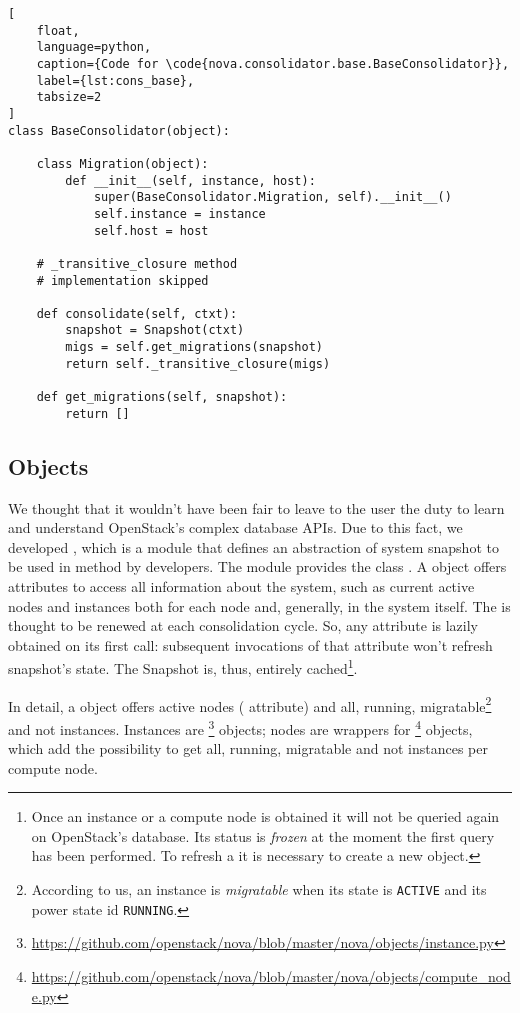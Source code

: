 \begin{lstlisting}[
	float,
	language=python,
	caption={Code for \code{nova.consolidator.base.BaseConsolidator}},
	label={lst:cons_base},
	tabsize=2
]
class BaseConsolidator(object):

	class Migration(object):
		def __init__(self, instance, host):
			super(BaseConsolidator.Migration, self).__init__()
			self.instance = instance
			self.host = host

	# _transitive_closure method
	# implementation skipped

	def consolidate(self, ctxt):
		snapshot = Snapshot(ctxt)
		migs = self.get_migrations(snapshot)
		return self._transitive_closure(migs)

	def get_migrations(self, snapshot):
		return []
\end{lstlisting}

\subsection{Objects}
\label{sub:cons_obj}
We thought that it wouldn't have been fair to leave to the user the duty to learn and understand OpenStack's complex database APIs.
Due to this fact, we developed , which is a module that defines an abstraction of system snapshot to be used in method  by developers. The module provides the class . A  object offers attributes to access all information about the system, such as current active nodes and instances both for each node and, generally, in the system itself. The  is thought to be renewed at each consolidation cycle. So, any attribute is lazily obtained on its first call: subsequent invocations of that attribute won't refresh snapshot's state. The Snapshot is, thus, entirely cached\footnote{Once an instance or a compute node is obtained it will not be queried again on OpenStack's database. Its status is \emph{frozen} at the moment the first query has been performed. To refresh a  it is necessary to create a new  object.}.

In detail, a  object offers active nodes ( attribute) and all, running, migratable\footnote{According to us, an instance is \emph{migratable} when its state is \texttt{ACTIVE} and its power state id \texttt{RUNNING}.} and not instances. Instances are \footnote{\url{https://github.com/openstack/nova/blob/master/nova/objects/instance.py}} objects; nodes are wrappers for \footnote{\url{https://github.com/openstack/nova/blob/master/nova/objects/compute_node.py}} objects, which add the possibility to get all, running, migratable and not instances per compute node.

